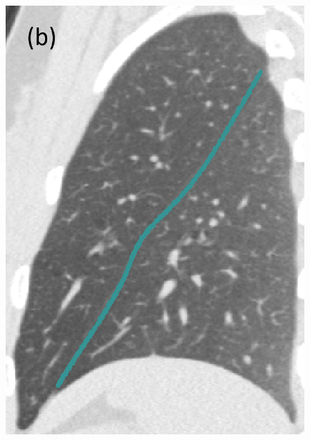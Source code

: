 \documentclass[]{spie}  %
\begin{document}
{\begin{figure}[htbp]
\begin{subfigure}
{\begin{minipage}[t]{0.15\linewidth}
  \includegraphics[width=\linewidth,trim={{.0\wd0} {.0\wd0} {.0\wd0} {.0\wd0}},clip]{Image/H1335_FRC_PCAInitial_Sagittal.png}
  \centerline{}
	\end{minipage}%
   }%
  \label{fig:HLASegmentationResults-b} 
\end{subfigure}
\begin{subfigure}{
  \begin{minipage}[t]{0.15\linewidth}

\end{minipage}}
\end{subfigure}
\end{figure}}
\end{document}
